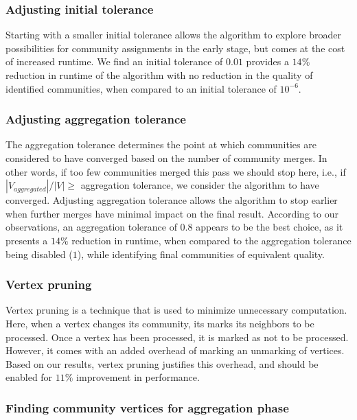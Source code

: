 \subsubsection{Adjusting initial tolerance}

Starting with a smaller initial tolerance allows the algorithm to explore broader possibilities for community assignments in the early stage, but comes at the cost of increased runtime. We find an initial tolerance of $0.01$ provides a $14\%$ reduction in runtime of the algorithm with no reduction in the quality of identified communities, when compared to an initial tolerance of $10^{-6}$.


\subsubsection{Adjusting aggregation tolerance}

The aggregation tolerance determines the point at which communities are considered to have converged based on the number of community merges. In other words, if too few communities merged this pass we should stop here, i.e., if $|V_{aggregated}|/|V| \geq$ aggregation tolerance, we consider the algorithm to have converged. Adjusting aggregation tolerance allows the algorithm to stop earlier when further merges have minimal impact on the final result. According to our observations, an aggregation tolerance of $0.8$ appears to be the best choice, as it presents a $14\%$ reduction in runtime, when compared to the aggregation tolerance being disabled ($1$), while identifying final communities of equivalent quality.


\subsubsection{Vertex pruning}

Vertex pruning is a technique that is used to minimize unnecessary computation. Here, when a vertex changes its community, its marks its neighbors to be processed. Once a vertex has been processed, it is marked as not to be processed. However, it comes with an added overhead of marking an unmarking of vertices. Based on our results, vertex pruning justifies this overhead, and should be enabled for $11\%$ improvement in performance.




\subsubsection{Finding community vertices for aggregation phase}

